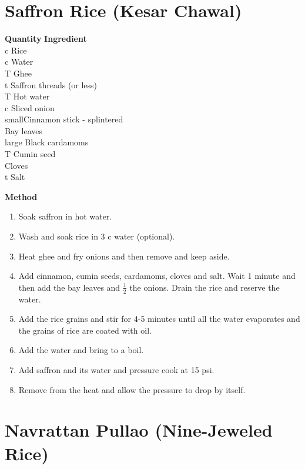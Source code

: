 \section{Saffron Rice (Kesar Chawal)}

\begin{tabbing}
\hspace{1.0cm}  \={\bf Quantity}   \hspace{3.0cm} \={\bf Ingredient}\\
 c\> Rice\\
 c \>Water\\
 T \>Ghee\\
 t \>Saffron threads (or less)\\
 T \>Hot water\\
 c \>Sliced onion\\
 small\>Cinnamon stick - splintered\\
 \>Bay leaves\\
 large \>Black cardamoms\\
  T \>Cumin seed\\
 \>Cloves\\
 t \>Salt\\
\end{tabbing}

{\bf Method}
\begin{enumerate}
\item Soak saffron in hot water.
\item Wash and soak rice in 3 c water (optional).
\item Heat ghee and fry onions and then remove and keep aside.
\item Add cinnamon, cumin seeds, cardamoms, cloves and salt.  Wait 1 minute and then
add the bay leaves and $\frac{1}{2}$ the onions.  Drain the rice and reserve the water.
\item Add the rice grains and stir for 4-5 minutes until all the water
evaporates and the grains of rice are coated with oil.
\item Add the water and bring to a boil.  
\item Add saffron and its water and pressure
cook at 15 psi.
\item Remove from the heat and allow the pressure to drop by itself.
\end{enumerate}


\section{Navrattan Pullao  (Nine-Jeweled Rice)}

